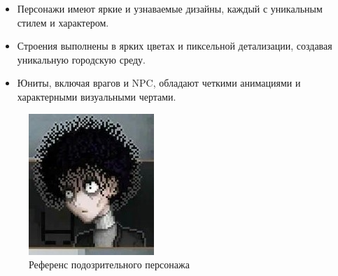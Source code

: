 \documentclass{article}
\begin{document}
	\begin{itemize}
		\item Персонажи имеют яркие и узнаваемые дизайны, каждый с уникальным стилем и характером.
		\item Строения выполнены в ярких цветах и пиксельной детализации, создавая уникальную городскую среду.
		\item Юниты, включая врагов и NPC, обладают четкими анимациями и характерными визуальными чертами.
		\newpage
		
	\end{itemize}
	\begin{figure}[h]
		\begin{minipage}{0.4\textwidth}
			\centering
			\includegraphics[width=\textwidth]{images/college.jpg}
			\caption{Референс подозрительного персонажа}
			\label{fig:actor1}
		\end{minipage} 
		\hfill
		\begin{minipage}{0.4\textwidth}
			\centering

\end{minipage}
\end{figure}
\end{document}
